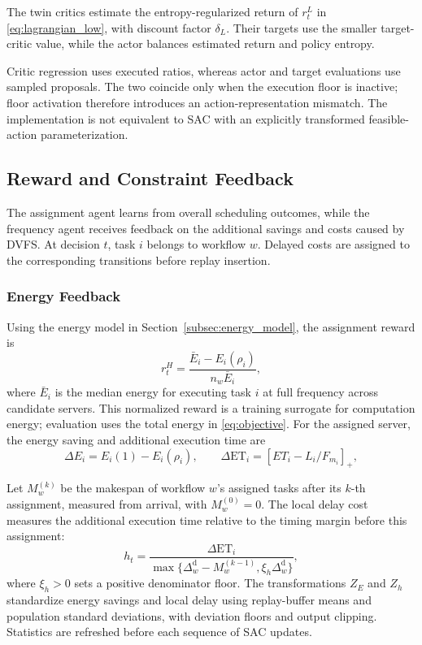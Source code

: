 \documentclass[journal]{IEEEtran}
\begin{document}
The twin critics estimate the entropy-regularized return of $r_t^L$ in \eqref{eq:lagrangian_low}, with discount factor $\delta_L$. Their targets use the smaller target-critic value, while the actor balances estimated return and policy entropy.

Critic regression uses executed ratios, whereas actor and target evaluations use sampled proposals. The two coincide only when the execution floor is inactive; floor activation therefore introduces an action-representation mismatch. The implementation is not equivalent to SAC with an explicitly transformed feasible-action parameterization.

\subsection{Reward and Constraint Feedback}
\label{subsec:credit}

The assignment agent learns from overall scheduling outcomes, while the frequency agent receives feedback on the additional savings and costs caused by DVFS. At decision $t$, task $i$ belongs to workflow $w$. Delayed costs are assigned to the corresponding transitions before replay insertion.

\subsubsection{Energy Feedback}

Using the energy model in Section~\ref{subsec:energy_model}, the assignment reward is
\begin{equation}
    r_t^H=\frac{\bar E_i-E_i(\rho_i)}{n_w\bar E_i},
    \label{eq:method_high_energy}
\end{equation}
where $\bar E_i$ is the median energy for executing task $i$ at full frequency across candidate servers. This normalized reward is a training surrogate for computation energy; evaluation uses the total energy in \eqref{eq:objective}. For the assigned server, the energy saving and additional execution time are
\[
    \Delta E_i=E_i(1)-E_i(\rho_i),
    \qquad
    \Delta\mathrm{ET}_i=[ET_i-L_i/F_{m_i}]_+,
\]

Let $M_w^{(k)}$ be the makespan of workflow $w$'s assigned tasks after its $k$-th assignment, measured from arrival, with $M_w^{(0)}=0$. The local delay cost measures the additional execution time relative to the timing margin before this assignment:
\begin{equation}
    h_t=\frac{\Delta\mathrm{ET}_i}
    {\max\{\Delta_w^{\mathrm d}-M_w^{(k-1)},
           \xi_h\Delta_w^{\mathrm d}\}},
    \label{eq:method_local_delay}
\end{equation}
where $\xi_h>0$ sets a positive denominator floor. The transformations $Z_E$ and $Z_h$ standardize energy savings and local delay using replay-buffer means and population standard deviations, with deviation floors and output clipping. Statistics are refreshed before each sequence of SAC updates.
\end{document}
